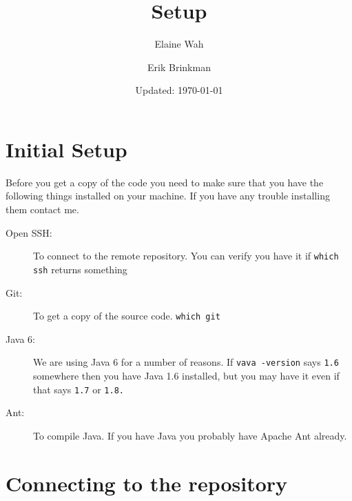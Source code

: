 \documentclass[11pt]{article}
\title{Setup}
\author{
  Elaine Wah \\
  \email{ewah@umich.edu}
  \and
  Erik Brinkman \\
  \email{erik.brinkman@umich.edu}
}
\date{Updated: \today}
\begin{document}
\maketitle

\section{Initial Setup}

Before you get a copy of the code you need to make sure that you have the
following things installed on your machine. If you have any trouble installing
them contact me.

\begin{description}
\item[Open SSH:] To connect to the remote repository. You can verify you have it
  if \texttt{which ssh} returns something
\item[Git:] To get a copy of the source code. \texttt{which git}
\item[Java 6:] We are using Java 6 for a number of reasons. If \texttt{vava -version} says \texttt{1.6} somewhere then you have Java 1.6 installed, but you may
  have it even if that says \texttt{1.7} or \texttt{1.8.}
\item[Ant:] To compile Java. If you have Java you probably have Apache Ant already.
\end{description}

\section{Connecting to the repository}
\end{document}
